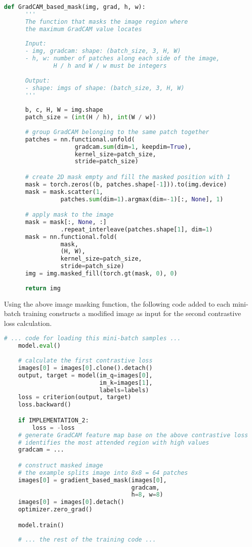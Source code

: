 \documentclass[12pt,twoside]{report}
\begin{document}
\begin{lstlisting}[language=Python, caption=Gradient-based Masking function]
    def GradCAM_based_mask(img, grad, h, w):
      '''
      The function that masks the image region where 
      the maximum GradCAM value locates
    
      Input:
      - img, gradcam: shape: (batch_size, 3, H, W)
      - h, w: number of patches along each side of the image, 
              H / h and W / w must be integers
    
      Output: 
      - shape: imgs of shape: (batch_size, 3, H, W)
      '''
    
      b, c, H, W = img.shape
      patch_size = (int(H / h), int(W / w))
      
      # group GradCAM belonging to the same patch together 
      patches = nn.functional.unfold(
                    gradcam.sum(dim=1, keepdim=True), 
                    kernel_size=patch_size, 
                    stride=patch_size)

      # create 2D mask empty and fill the masked position with 1
      mask = torch.zeros((b, patches.shape[-1])).to(img.device)
      mask = mask.scatter(1, 
                patches.sum(dim=1).argmax(dim=-1)[:, None], 1)

      # apply mask to the image
      mask = mask[:, None, :]
                .repeat_interleave(patches.shape[1], dim=1)
      mask = nn.functional.fold(
                mask, 
                (H, W), 
                kernel_size=patch_size, 
                stride=patch_size)
      img = img.masked_fill(torch.gt(mask, 0), 0)
      
      return img
\end{lstlisting} \label{fig:masking_code}

Using the above image masking function, the following code added to each mini-batch training constructs a modified image as input for the second contrastive loss calculation. 

\begin{lstlisting}[language=Python, caption=additional training code for using ]
    # ... code for loading this mini-batch samples ...
    model.eval()
    
    # calculate the first contrastive loss
    images[0] = images[0].clone().detach()
    output, target = model(im_q=images[0], 
                           im_k=images[1], 
                           labels=labels)
    loss = criterion(output, target)
    loss.backward()

    if IMPLEMENTATION_2:
        loss = -loss
    # generate GradCAM feature map base on the above contrastive loss
    # identifies the most attended region with high values
    gradcam = ...

    # construct masked image
    # the example splits image into 8x8 = 64 patches
    images[0] = gradient_based_mask(images[0], 
                                    gradcam, 
                                    h=8, w=8)
    images[0] = images[0].detach()
    optimizer.zero_grad()

    model.train()
    
    # ... the rest of the training code ...
\end{lstlisting} \label{gradcam_code2}
\end{document}
